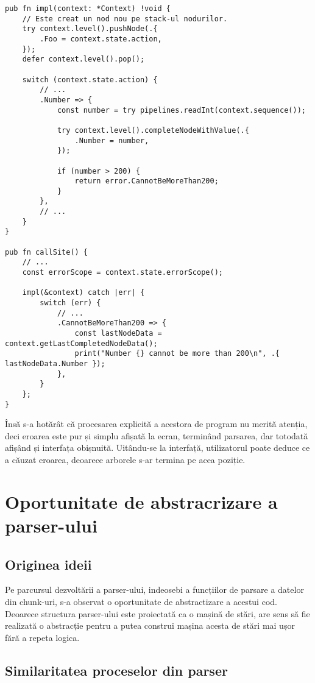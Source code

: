 \documentclass[a4paper,12pt]{report}
\begin{document}
\begin{verbatim}
pub fn impl(context: *Context) !void {
    // Este creat un nod nou pe stack-ul nodurilor.
    try context.level().pushNode(.{
        .Foo = context.state.action,
    });
    defer context.level().pop();

    switch (context.state.action) {
        // ...
        .Number => {
            const number = try pipelines.readInt(context.sequence());

            try context.level().completeNodeWithValue(.{
                .Number = number,
            });

            if (number > 200) {
                return error.CannotBeMoreThan200;
            }
        },
        // ...
    }
}

pub fn callSite() {
    // ... 
    const errorScope = context.state.errorScope();

    impl(&context) catch |err| {
        switch (err) {
            // ...
            .CannotBeMoreThan200 => {
                const lastNodeData = context.getLastCompletedNodeData();
                print("Number {} cannot be more than 200\n", .{ lastNodeData.Number });
            },
        }
    };
}
\end{verbatim}

Însă s-a hotărât că procesarea explicită a acestora de program nu merită atenția,
deci eroarea este pur și simplu afișată la ecran, terminând parsarea,
dar totodată afișând și interfața obișnuită.
Uitându-se la interfață, utilizatorul poate deduce ce a căuzat eroarea,
deoarece arborele s-ar termina pe acea poziție.

\section{Oportunitate de abstracrizare a parser-ului}

\subsection{Originea ideii}

Pe parcursul dezvoltării a parser-ului, indeosebi a funcțiilor de parsare a datelor din chunk-uri,
s-a observat o oportunitate de abstractizare a acestui cod.
Deoarece structura parser-ului este proiectată ca o mașină de stări,
are sens să fie realizată o abstracție pentru a putea construi mașina acesta de stări mai ușor
fără a repeta logica.

\subsection{Similaritatea proceselor din parser}
\end{document}

